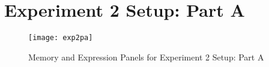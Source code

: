 \section*{Experiment 2 Setup: Part A}
\begin{figure}[htp]
\centering
\texttt{[image: exp2pa]}
\caption[experiment 2: part a]{Memory and Expression Panels for Experiment 2 Setup: Part A}\label{fig:exp2pa}
\end{figure}